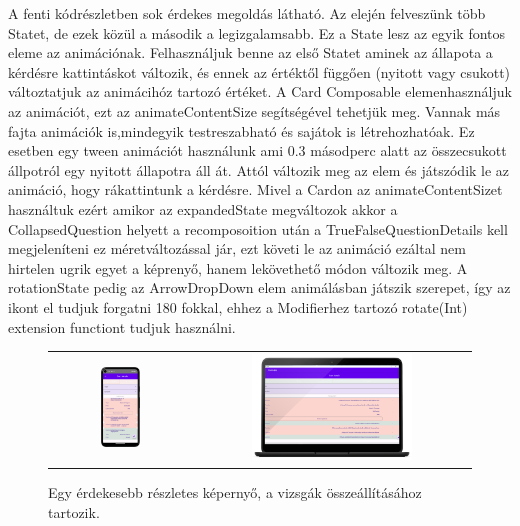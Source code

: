A fenti kódrészletben sok érdekes megoldás látható.
Az elején felveszünk több Statet, de ezek közül a második a legizgalamsabb. Ez a State lesz az egyik fontos eleme az animációnak.
Felhasználjuk benne az első Statet aminek az állapota a kérdésre kattintáskot változik, és ennek az értéktől függően (nyitott vagy csukott) változtatjuk az animácihóz tartozó értéket.
A Card Composable elemenhasználjuk az animációt, ezt az animateContentSize segítségével tehetjük meg.
Vannak más fajta animációk is,mindegyik testreszabható és sajátok is létrehozhatóak. Ez esetben egy tween animációt használunk ami 0.3 másodperc alatt az összecsukott állpotról egy nyitott állapotra áll át.
Attól változik meg az elem és játszódik le az animáció, hogy rákattintunk a kérdésre.
Mivel a Cardon az animateContentSizet használtuk ezért amikor az expandedState megváltozok akkor a CollapsedQuestion helyett a recomposoition után a TrueFalseQuestionDetails kell megjeleníteni ez méretváltozással jár, ezt követi le az animáció ezáltal nem hirtelen ugrik egyet a képrenyő, hanem lekövethető módon változik meg.
A rotationState pedig az ArrowDropDown elem animálásban játszik szerepet, így az ikont el tudjuk forgatni 180 fokkal, ehhez a Modifierhez tartozó rotate(Int) extension functiont tudjuk használni.

\begin{figure}[!ht]
    \centering
    \begin{tabular}{cc}
        \includegraphics[width=0.3\textwidth, keepaspectratio]{figures/Details_Android.png} & 
        \includegraphics[width=0.6\textwidth, keepaspectratio]{figures/Details_Desktop_framed.png}
    \end{tabular}
    \caption{Egy érdekesebb részletes képernyő, a vizsgák összeállításához tartozik.}
    \label{fig:DetailsScreen}
\end{figure}

